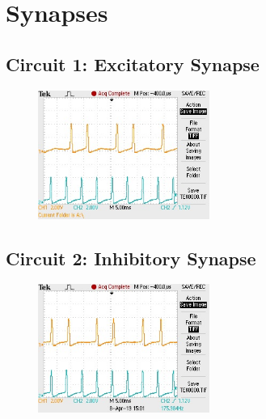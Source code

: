 \documentclass[12]{amsbook}
\newcommand\0{\mathbf{0}}
\newcommand\<{\langle}
\renewcommand\>{\rangle}
\begin{document}
\chapter{Synapses}

\section{Circuit 1: Excitatory Synapse}

\begin{figure}[H]
\centering
\includegraphics[width=0.5\textwidth]{excitatory.jpg}	
\end{figure}

\section{Circuit 2: Inhibitory Synapse}

\begin{figure}[H]
\centering
\includegraphics[width=0.5\textwidth]{inhibitory.jpg}	
\end{figure}

\chapter{}




\nocite{*}
\end{document}
